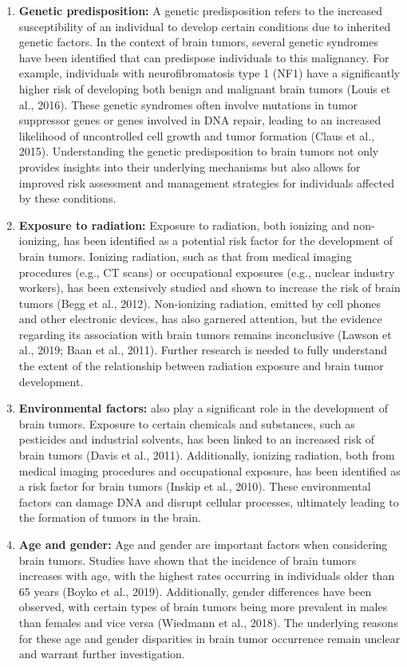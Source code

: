 \documentclass[12pt,oneside]{report}
\begin{document}
\begin{enumerate}
\item \textbf{Genetic predisposition:}
A genetic predisposition refers to the increased susceptibility of an individual to develop certain conditions due to inherited genetic factors. In the context of brain tumors, several genetic syndromes have been identified that can predispose individuals to this malignancy. For example, individuals with neurofibromatosis type 1 (NF1) have a significantly higher risk of developing both benign and malignant brain tumors (Louis et al., 2016). These genetic syndromes often involve mutations in tumor suppressor genes or genes involved in DNA repair, leading to an increased likelihood of uncontrolled cell growth and tumor formation (Claus et al., 2015). Understanding the genetic predisposition to brain tumors not only provides insights into their underlying mechanisms but also allows for improved risk assessment and management strategies for individuals affected by these conditions.

\item \textbf{Exposure to radiation:}
Exposure to radiation, both ionizing and non-ionizing, has been identified as a potential risk factor for the development of brain tumors. Ionizing radiation, such as that from medical imaging procedures (e.g., CT scans) or occupational exposures (e.g., nuclear industry workers), has been extensively studied and shown to increase the risk of brain tumors (Begg et al., 2012). Non-ionizing radiation, emitted by cell phones and other electronic devices, has also garnered attention, but the evidence regarding its association with brain tumors remains inconclusive (Lawson et al., 2019; Baan et al., 2011). Further research is needed to fully understand the extent of the relationship between radiation exposure and brain tumor development.

\item \textbf{Environmental factors:}
also play a significant role in the development of brain tumors. Exposure to certain chemicals and substances, such as pesticides and industrial solvents, has been linked to an increased risk of brain tumors (Davis et al., 2011). Additionally, ionizing radiation, both from medical imaging procedures and occupational exposure, has been identified as a risk factor for brain tumors (Inskip et al., 2010). These environmental factors can damage DNA and disrupt cellular processes, ultimately leading to the formation of tumors in the brain.

\item \textbf{Age and gender:}
Age and gender are important factors when considering brain tumors. Studies have shown that the incidence of brain tumors increases with age, with the highest rates occurring in individuals older than 65 years (Boyko et al., 2019). Additionally, gender differences have been observed, with certain types of brain tumors being more prevalent in males than females and vice versa (Wiedmann et al., 2018). The underlying reasons for these age and gender disparities in brain tumor occurrence remain unclear and warrant further investigation.


\end{enumerate}
\end{document}
